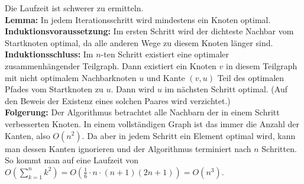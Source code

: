 \documentclass[a4paper,10pt]{article}
\begin{document}
\begin{description}
Die Laufzeit ist schwerer zu ermitteln.\\
\textbf{Lemma:} In jedem Iterationsschritt wird mindestens ein Knoten optimal.\\
\textbf{Induktionsvoraussetzung:} Im ersten Schritt wird der dichteste Nachbar vom Startknoten optimal, da alle anderen Wege zu diesem Knoten länger sind.\\
\textbf{Induktionsschluss:} Im $n$-ten Schritt existiert eine optimaler zusammenhängender Teilgraph. Dann existiert ein Knoten $v$ in diesem Teilgraph mit nicht optimalem Nachbarknoten $u$ und Kante $(v, u)$ Teil des optimalen Pfades vom Startknoten zu $u$. Dann wird $u$ im nächsten Schritt optimal. (Auf den Beweis der Existenz eines solchen Paares wird verzichtet.)\\
\textbf{Folgerung:} Der Algorithmus betrachtet alle Nachbarn der in einem Schritt verbesserten Knoten. In einem vollständigen Graph ist das immer die Anzahl der Kanten, also $O(n^2)$. Da aber in jedem Schritt ein Element optimal wird, kann man dessen Kanten ignorieren und der Algorithmus terminiert nach $n$ Schritten. So kommt man auf eine Laufzeit von $O(\sum\limits_{k=1}^n{k^2}) = O(\frac{1}{6}\cdot n \cdot (n+1)(2n+1)) = O(n^3)$.
\end{description}
\end{document}
